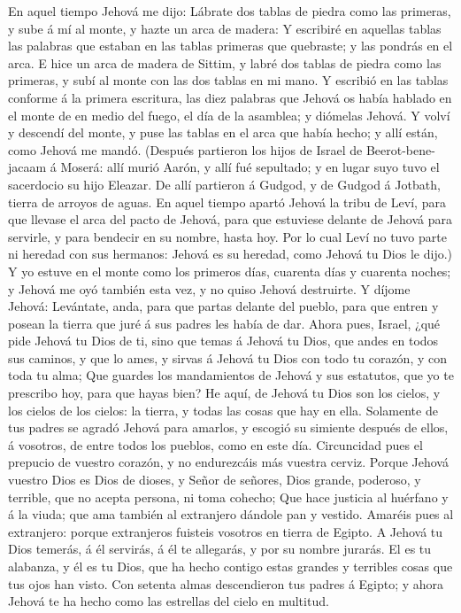  En aquel tiempo Jehová me dijo: Lábrate dos tablas de
piedra como las primeras, y sube á mí al monte, y hazte un arca de
madera:  Y escribiré en aquellas tablas las palabras que
estaban en las tablas primeras que quebraste; y las pondrás en el arca.
 E hice un arca de madera de Sittim, y labré dos tablas de
piedra como las primeras, y subí al monte con las dos tablas en mi mano.
 Y escribió en las tablas conforme á la primera escritura,
las diez palabras que Jehová os había hablado en el monte de en medio
del fuego, el día de la asamblea; y diómelas Jehová.  Y
volví y descendí del monte, y puse las tablas en el arca que había
hecho; y allí están, como Jehová me mandó.  (Después
partieron los hijos de Israel de Beerot-bene-jacaam á Moserá: allí murió
Aarón, y allí fué sepultado; y en lugar suyo tuvo el sacerdocio su hijo
Eleazar.  De allí partieron á Gudgod, y de Gudgod á Jotbath,
tierra de arroyos de aguas.  En aquel tiempo apartó Jehová
la tribu de Leví, para que llevase el arca del pacto de Jehová, para que
estuviese delante de Jehová para servirle, y para bendecir en su nombre,
hasta hoy.  Por lo cual Leví no tuvo parte ni heredad con
sus hermanos: Jehová es su heredad, como Jehová tu Dios le dijo.)
 Y yo estuve en el monte como los primeros días, cuarenta
días y cuarenta noches; y Jehová me oyó también esta vez, y no quiso
Jehová destruirte.  Y díjome Jehová: Levántate, anda, para
que partas delante del pueblo, para que entren y posean la tierra que
juré á sus padres les había de dar.  Ahora pues, Israel,
¿qué pide Jehová tu Dios de ti, sino que temas á Jehová tu Dios, que
andes en todos sus caminos, y que lo ames, y sirvas á Jehová tu Dios con
todo tu corazón, y con toda tu alma;  Que guardes los
mandamientos de Jehová y sus estatutos, que yo te prescribo hoy, para
que hayas bien?  He aquí, de Jehová tu Dios son los cielos,
y los cielos de los cielos: la tierra, y todas las cosas que hay en
ella.  Solamente de tus padres se agradó Jehová para
amarlos, y escogió su simiente después de ellos, á vosotros, de entre
todos los pueblos, como en este día.  Circuncidad pues el
prepucio de vuestro corazón, y no endurezcáis más vuestra cerviz.
 Porque Jehová vuestro Dios es Dios de dioses, y Señor de
señores, Dios grande, poderoso, y terrible, que no acepta persona, ni
toma cohecho;  Que hace justicia al huérfano y á la viuda;
que ama también al extranjero dándole pan y vestido. 
Amaréis pues al extranjero: porque extranjeros fuisteis vosotros en
tierra de Egipto.  A Jehová tu Dios temerás, á él servirás,
á él te allegarás, y por su nombre jurarás.  El es tu
alabanza, y él es tu Dios, que ha hecho contigo estas grandes y
terribles cosas que tus ojos han visto.  Con setenta almas
descendieron tus padres á Egipto; y ahora Jehová te ha hecho como las
estrellas del cielo en multitud.

